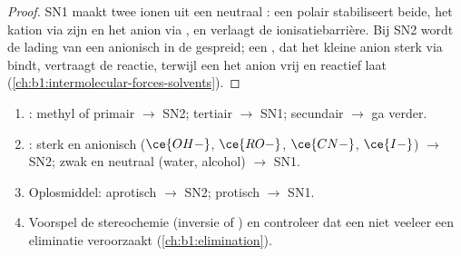 \begin{proof}
SN1 maakt twee ionen uit een neutraal : een polair  stabiliseert beide, het kation via zijn  en het
anion via , en verlaagt de ionisatiebarrière. Bij SN2
wordt de lading van een anionisch  in de 
gespreid; een , dat het kleine anion sterk via
 bindt, vertraagt de reactie, terwijl een  het anion vrij en reactief laat
(\cref{ch:b1:intermolecular-forces-solvents}).
\end{proof}

\begin{method}\label{met:b1:nucleophilic-substitution:choose-mechanism}
\begin{enumerate}
  \item {}: methyl of primair $\to$ SN2; tertiair $\to$ SN1;
        secundair $\to$ ga verder.
  \item {}: sterk en anionisch ($\ce{OH-}$, $\ce{RO-}$, $\ce{CN-}$,
        $\ce{I-}$) $\to$ SN2; zwak en neutraal (water, alcohol) $\to$ SN1.
  \item Oplosmiddel: aprotisch $\to$ SN2; protisch $\to$ SN1.
  \item Voorspel de stereochemie (inversie of ) en controleer
        dat een  niet veeleer een eliminatie veroorzaakt
        (\cref{ch:b1:elimination}).
\end{enumerate}
\end{method}


